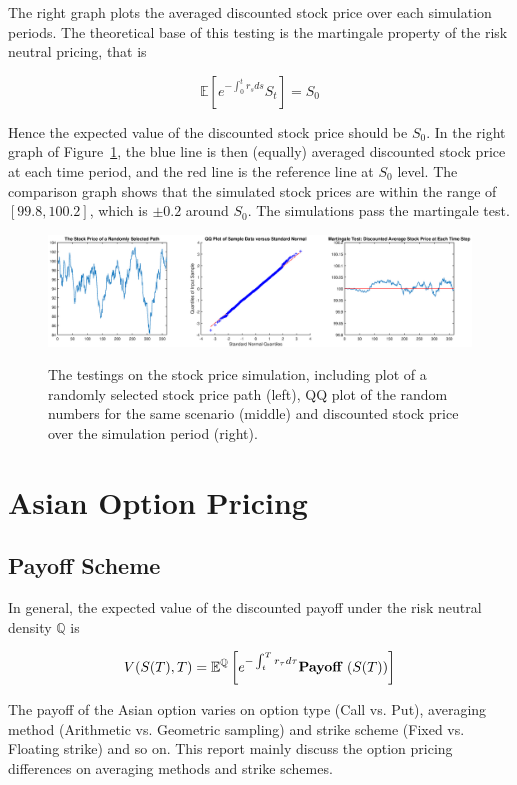 \documentclass[a4paper,11pt] {article}
\begin{document}
The right graph plots the averaged discounted stock price over each simulation periods. The theoretical base of this testing is the martingale property of the risk neutral pricing, that is

$$
\mathbb{E}\left[e^{-\int_0^t r_s ds}S_t\right] = S_0
$$

Hence the expected value of the discounted stock price should be $S_0$. In the right graph of Figure~\ref{fig::esg_test}, the blue line is then (equally) averaged discounted stock price at each time period, and the red line is the reference line at $S_0$ level. The comparison graph shows that the simulated stock prices are within the range of $[99.8,100.2]$, which is $\pm 0.2$ around $S_0$. The simulations pass the martingale test.

\begin{figure}
  \centering
  \includegraphics[scale=0.36]{esg_test.eps}\\
  \caption{The testings on the stock price simulation, including plot of a randomly selected stock price path (left), QQ plot of the random numbers for the same scenario (middle) and discounted stock price over the simulation period (right).}\label{fig::esg_test}
\end{figure}


\section{Asian Option Pricing}
\subsection{Payoff Scheme}
In general, the expected value of the discounted payoff under the risk neutral density $\mathbb{Q}$ is

$$
V(S(T),T) = \mathbb{E}^{\mathbb{Q}} \left[e^{-\int_t^T r_\tau d\tau} \textrm{\bf Payoff } (S(T)) \right]
$$

The payoff of the Asian option varies on option type (Call vs. Put), averaging method (Arithmetic vs. Geometric sampling) and strike scheme (Fixed vs. Floating strike) and so on. This report mainly discuss the option pricing differences on averaging methods and strike schemes.
\end{document}
